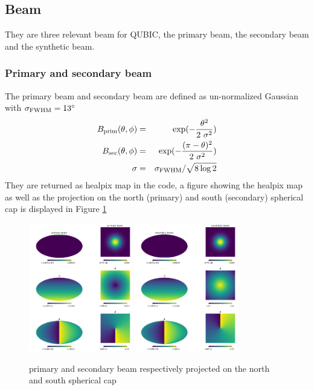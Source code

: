 \documentclass[a4paper, 11pt]{article}
\def\ba{\begin{eqnarray}}
\def\ea{\end{eqnarray}}
\begin{document}
\subsection{Beam}

They are three relevant beam for QUBIC, the primary beam, the secondary beam and the synthetic beam.
\subsubsection{Primary and secondary beam}

The primary beam and secondary beam are defined as un-normalized Gaussian with  $ \sigma_{\rm FWHM}=13^{\circ}$
\ba
B_{\rm prim}(\theta, \phi)&=& \exp( - \frac{\theta^{2}}{2 \sigma^{2}})  \\
B_{\rm sec}(\theta, \phi)&=& \exp( - \frac{ (\pi -\theta)^{2}}{2 \sigma^{2}})  \\
 \sigma &=& \sigma_{\rm FWHM} / \sqrt{8\log 2}
\ea
They are returned as healpix map in the code, a figure showing the healpix map as well as the projection on the north (primary) and south (secondary) spherical cap is displayed in Figure \ref{fig:prim_second_beam}
\begin{figure}
  \centering
  \includegraphics[width=0.4\textwidth]{primary_beam.png}
    \includegraphics[width=0.4\textwidth]{secondary_beam.png}
  \caption{primary and secondary beam respectively projected on the north and south spherical cap}
  \label{fig:prim_second_beam}
\end{figure}
\end{document}
